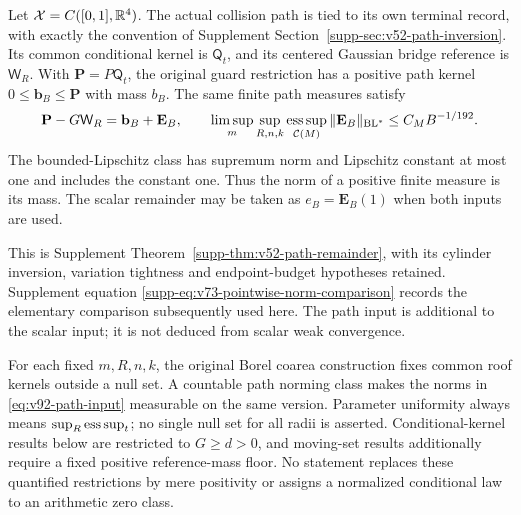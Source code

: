 \begin{inputstatement}
\label{input:v92-path}
Let $\mathcal X=C([0,1],\mathbb R^4)$. The actual collision path is tied to
its own terminal record, with exactly the convention of Supplement
Section~\ref{supp-sec:v52-path-inversion}. Its common conditional
kernel is $\mathsf Q_t$, and its centered Gaussian bridge reference
is $\mathsf W_R$. With $\mathbf P=P\mathsf Q_t$, the original guard
restriction has a positive path kernel $0\le\mathbf b_B\le\mathbf P$
with mass $b_B$. The same finite path measures satisfy
\begin{equation}\label{eq:v92-path-input}
 \mathbf P-G\mathsf W_R=\mathbf b_B+\mathbf E_B,\qquad
 \limsup_m\sup_{R,n,k}\esssup_{\mathcal C(M)}
             \|\mathbf E_B\|_{\mathrm{BL}^*}\le C_MB^{-1/192}.
\end{equation}
The bounded-Lipschitz class has supremum norm and Lipschitz constant
at most one and includes the constant one. Thus the norm of a positive
finite measure is its mass. The scalar remainder may be taken as
$e_B=\mathbf E_B(1)$ when both inputs are used.
\end{inputstatement}
This is Supplement Theorem~\ref{supp-thm:v52-path-remainder}, with
its cylinder inversion, variation tightness and endpoint-budget
hypotheses retained. Supplement equation
\eqref{supp-eq:v73-pointwise-norm-comparison} records the elementary
comparison subsequently used here. The path input is additional to
the scalar input; it is not deduced from scalar weak convergence.

For each fixed $m,R,n,k$, the original Borel coarea construction fixes
common roof kernels outside a null set. A countable path norming class
makes the norms in \eqref{eq:v92-path-input} measurable on the same
version. Parameter uniformity always means $\sup_R\operatorname*{ess\,sup}_t$; no
single null set for all radii is asserted. Conditional-kernel results
below are restricted to $G\ge d>0$, and moving-set results additionally
require a fixed positive reference-mass floor. No statement replaces
these quantified restrictions by mere positivity or assigns a
normalized conditional law to an arithmetic zero class.
